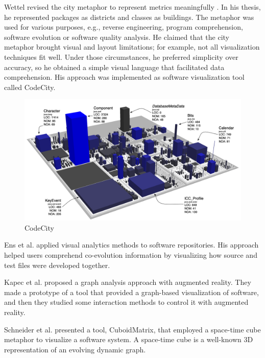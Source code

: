 Wettel revised the city metaphor to represent metrics meaningfully  \cite{Wettel2011}. 
In his thesis, he represented packages as districts and classes as buildings.
The metaphor was used for various purposes, e.g., reverse engineering, program comprehension, software evolution or software quality analysis. 
He claimed that the city metaphor brought visual and layout limitations; for example, not all visualization techniques fit well.
Under those circumstances, he preferred simplicity over accuracy,
so he obtained a simple visual language that facilitated data comprehension. His approach was implemented as software visualization tool 
called CodeCity. 


\begin{figure}[H]
  \includegraphics[width=0.9\linewidth]{CodeCity.png} 
  \caption{CodeCity}
\end{figure}



Ens et al. \cite{Ens2014} applied visual analytics methods to software repositories.
His approach helped users comprehend co-evolution information by visualizing how source and test files were developed together. 

Kapec et al. \cite{Kapec2015} proposed a graph analysis approach with augmented reality. 
They made a prototype of a tool that provided a graph-based visualization of software, and then they studied some interaction methods to control it with augmented reality.

Schneider et al. \cite{Schneider2016} presented a tool, CuboidMatrix, that employed a space-time cube metaphor to visualize a software system. 
A space-time cube is a well-known 3D representation of an evolving dynamic graph. 

